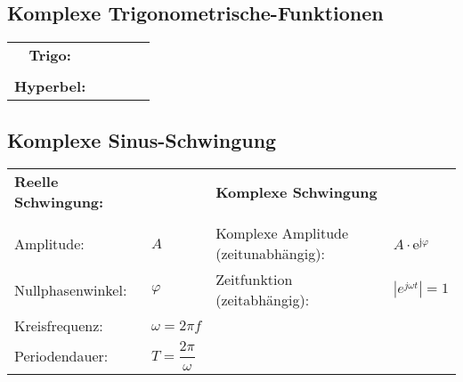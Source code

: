 				\subsection{Komplexe Trigonometrische-Funktionen}
					\begin{tabular}{ccccc}
						\textbf{Trigo:} & \fbox{$\displaystyle \sin (\alpha)=\frac{\mathrm{e}^{\mathrm{j} \alpha}-\mathrm{e}^{-\mathrm{j} \alpha}}{2 \mathrm{j}}$} & \fbox{$\displaystyle \cos (\alpha)=\frac{e^{j \alpha}+e^{-j \alpha}}{2}$} & \fbox{$\displaystyle \tan \alpha=\frac{\sin \alpha}{\cos \alpha}=-j \frac{e^{j \alpha}-e^{-j \alpha}}{e^{j \alpha}+e^{-j \alpha}}$} & \\[4.5mm]
						& \fbox{$\displaystyle \sin(\mathrm{j} \alpha) = \mathrm{j} \sinh(\alpha)$}
						& \fbox{$\displaystyle \cos(\mathrm{j} \alpha) = \cosh(\alpha)$} &&\\[6pt]
						\textbf{Hyperbel:} & \fbox{$\displaystyle \sinh (\alpha)=\frac{\mathrm{e}^{\alpha}-\mathrm{e}^{-\alpha}}{2}$} & \fbox{$\displaystyle \cosh (\alpha)=\frac{\mathrm{e}^{\alpha}+\mathrm{e}^{-\alpha}}{2}$} & \fbox{$\displaystyle \tanh (\alpha)=\frac{\sinh (\alpha)}{\cosh (\alpha)} = \dfrac{\mathrm{e}^\alpha - \mathrm{e}^{-\alpha}}{\mathrm{e}^\alpha + \mathrm{e}^{-\alpha}}$}&\\
					\end{tabular}
				
				\subsection{Komplexe Sinus-Schwingung}
					\begin{tabular}{ll|ll}
						\textbf{Reelle Schwingung:} & & \textbf{Komplexe Schwingung} & \\[3pt]
						\fbox{$\displaystyle z(t)=A \cdot \sin (\omega t+\varphi)$} & & \fbox{$\displaystyle  z(t)=\operatorname{Im}\left[A \cdot \mathrm{e}^{\mathrm{j}(\omega t+\varphi)}\right]=\operatorname{Im}\left[A \cdot \mathrm{e}^{\mathrm{j} \varphi} \cdot \mathrm{e}^{\mathrm{j} \omega t}\right]$} & \\[5pt]
						Amplitude: & $\displaystyle A$ & Komplexe Amplitude (zeitunabhängig): & $\displaystyle A \cdot \mathrm{e}^{\mathrm{j} \varphi}$\\[5pt]
						Nullphasenwinkel: & $\displaystyle \varphi$ & Zeitfunktion (zeitabhängig): & $\displaystyle \left|e^{j \omega t}\right|=1$\\[5pt]
						Kreisfrequenz: & $\displaystyle \omega=2 \pi f$ & & \\[5pt]
						Periodendauer: & $\displaystyle T=\dfrac{2 \pi}{\omega}$ & & \\[5pt]
					\end{tabular}
				
